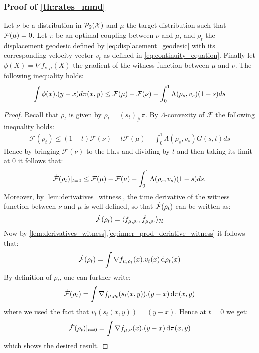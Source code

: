 \subsubsection{Proof of \cref{th:rates_mmd}}

\begin{lemma}	\label{lem:grad_flow_lambda_version}
Let $\nu$ be a distribution in $\mathcal{P}_2({{\mathcal X}})$ and $\mu$ the target distribution such that ${{\mathcal F}}(\mu)=0$.  Let $\pi$ be an optimal coupling between $\nu$ and $\mu$, and $\rho_t$ the displacement geodesic defined by \cref{eq:displacement_geodesic} with its corresponding velocity vector  $v_t$ as defined in \cref{eq:continuity_equation}. Finally let $\phi(X)=\nabla f_{\nu,\mu}(X)$ the gradient of the witness function between $\mu$ and $\nu$. The following inequality holds: 
\begin{align*}
	\int \phi(x).(y-x) d\pi(x,y)
	\leq
	{{\mathcal F}}(\mu)- {{\mathcal F}}(\nu) -\int_0^1 \Lambda(\rho_s,v_s)(1-s)ds
\end{align*}

\end{lemma}
\begin{proof}
Recall that $\rho_t$ is given by $\rho_t = (s_t)_{\#}\pi$. By $\Lambda$-convexity of $\mathcal{F}$ the following inequality holds:
	\begin{align*}
		\mathcal{F}(\rho_{t})\leq (1-t)\mathcal{F}(\nu)+t \mathcal{F}(\mu) - \int_0^1 \Lambda(\rho_s,v_s)G(s,t)ds
	\end{align*}
	Hence by bringing $\mathcal{F}(\nu)$ to the l.h.s and dividing by $t$ and then taking its limit at $0$ it follows that:
	\begin{align*}
	\dot{{{\mathcal F}}}(\rho_t)\vert_{t=0}\leq \mathcal	{F}(\mu)-\mathcal{F}(\nu)-\int_0^1 \Lambda(\rho_s,v_s)(1-s)ds.	
	\end{align*}
	Moreover, by \cref{lem:derivatives_witness}, the time derivative of the witness function between $\nu$ and $\mu$ is well defined, so that $\dot{{{\mathcal F}}}(\rho_t)$ can be written as:
	\[
	\dot{{{\mathcal F}}}(\rho_t) = \langle f_{\mu,\rho_t},\dot{f}_{\mu,\rho_t} \rangle_{{{\mathcal H}}}
	\]
	Now by \cref{lem:derivatives_witness},\cref{eq:inner_prod_deriative_witness} it follows that:
\[
\dot{{{\mathcal F}}}(\rho_t) = \int \nabla f_{\mu,\rho_t}(x).v_t(x)\mathop{}\!\mathrm{d} \rho_t(x)
\]
By definition of $\rho_t$,  one can further write:
\[
\dot{{{\mathcal F}}}(\rho_t) = \int \nabla f_{\mu,\rho_t}(s_t(x,y)).(y-x)\mathop{}\!\mathrm{d} \pi(x,y)
\]
where we used the fact that $v_t(s_t(x,y))=(y-x)$. Hence at $t=0$ we get:
\[
\dot{{{\mathcal F}}}(\rho_t)\vert_{t=0} = \int \nabla f_{\mu,\nu}(x).(y-x)\mathop{}\!\mathrm{d} \pi(x,y)
\]
which shows the desired result.
\end{proof}





